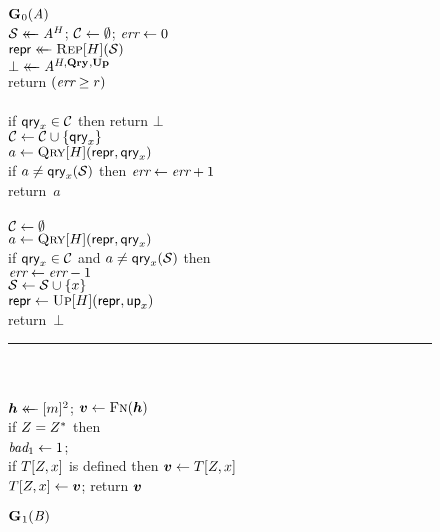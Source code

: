 \begin{figure*}
  {
    \underline{$\game_0(\advA)$}\\[2pt]
      $\col \getsr \advA^H$; $\setC \gets \emptyset$; $\err \gets 0$\\
      $\pub \getsr \Rep[H](\col)$\\
      $\bot \getsr \advA^{H,\QRYO,\UPO}$\\
      return $(\err \geq r)$
    \\[6pt]
    \\[2pt]
      if $\qry_x \in \mathcal{C}$ then return $\bot$\\
      $\setC \gets \setC \union \{\qry_x\}$\\
      $a \gets \Qry[H](\pub, \qry_x)$\\
      if $a \neq \qry_x(\col)$ then $\err \gets \err + 1$\\
      return~$a$
    \\[6pt]
    \\[2pt]
      $\setC \gets \emptyset$\\
      $a \gets \Qry[H](\pub, \qry_x)$\\
      if $\qry_x \in \setC$ and $a \neq \qry_x(\col)$ then\\
      \tab $\err \gets \err-1$\\
      $\col \gets \col \union \{x\}$\\
      $\pub \gets \Up[H](\pub,\up_x)$\\
      return~$\bot$
    \\[4pt]
    \hspace*{-4pt}\rule{1.043\textwidth}{.4pt}
    \\[5pt]
     \hfill{}\hspace*{3pt}\\
      $\hh \getsr [m]^2$; $\vv \gets \fff(\hh)$\\
      if $\salt = \salt^*$ then\\
      \tab $\bad_1 \gets 1$; \\
      if $T[\salt,x]$ is defined then $\vv \gets T[\salt,x]$\\
      $T[\salt,x] \gets \vv$;
      return $\vv$
  }
  {
    \underline{$\game_1(\advB)$}\\[2pt]
}
\end{figure*}
